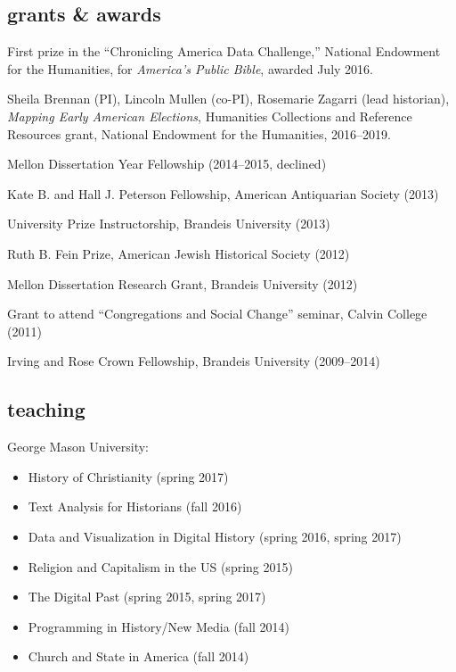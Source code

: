 \documentclass[11pt]{article}
\providecommand{\tightlist}{%
  \setlength{\itemsep}{0pt}\setlength{\parskip}{0pt}}
\begin{document}
\subsection{grants \& awards}\label{grants-awards}

First prize in the ``Chronicling America Data Challenge,'' National Endowment 
for the Humanities, for \emph{America's Public Bible}, awarded July 2016.

Sheila Brennan (PI), Lincoln Mullen (co-PI), Rosemarie Zagarri (lead 
historian), \emph{Mapping Early American Elections}, Humanities Collections 
and Reference Resources grant, National Endowment for the Humanities, 
2016--2019.

Mellon Dissertation Year Fellowship (2014--2015, declined)

Kate B. and Hall J. Peterson Fellowship, American Antiquarian Society (2013)

University Prize Instructorship, Brandeis University (2013)

Ruth B. Fein Prize, American Jewish Historical Society (2012)

Mellon Dissertation Research Grant, Brandeis University (2012)

Grant to attend ``Congregations and Social Change'' seminar, Calvin College 
(2011)

Irving and Rose Crown Fellowship, Brandeis University (2009--2014)

\subsection{teaching}\label{teaching}

George Mason University:

\vspace{-0.2in}

\begin{itemize}
    \tightlist
  \item History of Christianity (spring 2017)
  \item Text Analysis for Historians (fall 2016)
  \item Data and Visualization in Digital History (spring 2016, spring 2017)
  \item Religion and Capitalism in the US (spring 2015) 
  \item The Digital Past (spring 2015, spring 2017)
  \item Programming in History/New Media (fall 2014) 
  \item Church and State in America (fall 2014)
\end{itemize}
\end{document}
